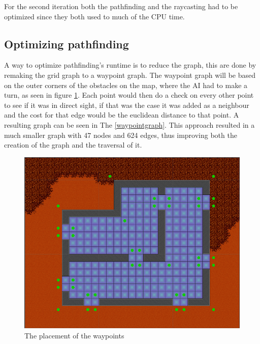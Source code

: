 For the second iteration both the pathfinding and the raycasting had to be optimized since they both used to much of the CPU time.

\subsection*{Optimizing pathfinding}
A way to optimize pathfinding's runtime is to reduce the graph, this are done by remaking the grid graph to a waypoint graph.
The waypoint graph will be based on the outer corners of the obstacles on the map, where the AI had to make a turn, as seen in figure \ref{waypointsNode}.
Each point would then do a check on every other point to see if it was in direct sight, if that was the case it was added as a neighbour and the cost for that edge would be the euclidean distance to that point.
A resulting graph can be seen in The  \ref{waypointgraph}.
This approach resulted in a much smaller graph with 47 nodes and 624 edges, thus improving both the creation of the graph and the traversal of it.

\begin{figure}[H]
	\includegraphics[width=\textwidth]{figures/astar/waypoints}
	\caption{The placement of the waypoints}
	\label{waypointsNode}
\end{figure}

